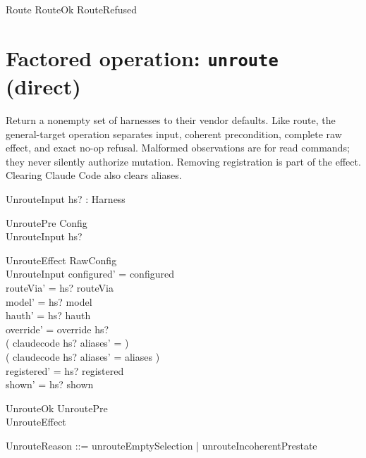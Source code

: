 \documentclass{article}
\begin{document}
\begin{zed}
	Route  RouteOk \lor RouteRefused
\end{zed}

\section{Factored operation: \texttt{unroute} (direct)}

Return a nonempty set of harnesses to their vendor defaults.  Like route, the
general-target operation separates input, coherent precondition, complete raw
effect, and exact no-op refusal.  Malformed observations are for read commands;
they never silently authorize mutation.  Removing registration is part of the
effect.  Clearing Claude Code also clears aliases.

\begin{schema}{UnrouteInput}
	hs? : \power Harness
\end{schema}

\begin{schema}{UnroutePre}
	Config \\
	UnrouteInput
	\where
	hs? \neq \emptyset
\end{schema}

\begin{schema}{UnrouteEffect}
	\Delta RawConfig \\
	UnrouteInput
	\where
	configured' = configured \\
	routeVia' = hs? \ndres routeVia \\
	model' = hs? \ndres model \\
	hauth' = hs? \ndres hauth \\
	override' = override \setminus hs? \\
	( claudecode \in hs? \implies aliases' = \emptyset ) \\
	( claudecode \notin hs? \implies aliases' = aliases ) \\
	registered' = hs? \ndres registered \\
	shown' = hs? \ndres shown
\end{schema}

\begin{schema}{UnrouteOk}
	UnroutePre \\
	UnrouteEffect
\end{schema}

\begin{zed}
	UnrouteReason ::= unrouteEmptySelection | unrouteIncoherentPrestate
\end{zed}
\end{document}
